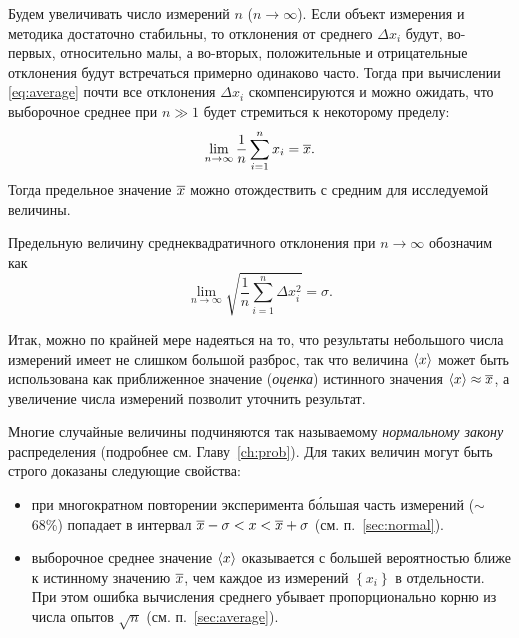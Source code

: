 Будем увеличивать число измерений $n$ ($n\to \infty$). Если объект измерения и методика
достаточно стабильны, то отклонения от среднего $\Delta x_i$ будут, во-первых,
относительно малы, а во-вторых, положительные и отрицательные отклонения будут
встречаться примерно одинаково часто. Тогда при вычислении \eqref{eq:average}
почти все отклонения $\Delta x_i$ скомпенсируются и можно ожидать,
что выборочное среднее при $n\gg 1$ будет стремиться к некоторому пределу:
\[
\lim_{n\to\infty}\frac{1}{n}\sum_{i=1}^{n}x_{i}=\overline{x}.
\]
Тогда предельное значение $\overline{x}$ можно отождествить с  средним
для исследуемой величины.

Предельную величину среднеквадратичного отклонения при $n\to\infty$
обозначим как
\[
\lim\limits _{n\to\infty}\sqrt{\frac{1}{n}\sum\limits _{i=1}^{n}\Delta
x_{i}^{2}} = \sigma.
\]




Итак, можно по крайней мере надеяться на то, что результаты небольшого числа
измерений имеет не слишком большой разброс, так что величина $\left<x\right>$
может быть использована как приближенное значение (\emph{оценка}) истинного значения
$\left<x\right>\approx \overline{x}$,
а увеличение числа измерений позволит уточнить результат.

Многие случайные величины подчиняются так называемому \emph{нормальному закону}
распределения (подробнее см. Главу~\ref{ch:prob}). Для таких величин
могут быть строго доказаны следующие свойства:
\begin{itemize}
    \item при многократном повторении эксперимента б\'{о}льшая часть измерений
    ($\sim$68\%) попадает в интервал $\overline{x}-\sigma<x<
    \overline{x}+\sigma$
    (см. п.~\ref{sec:normal}).
    \item выборочное среднее значение $\left<x\right>$ оказывается с большей
    вероятностью ближе к истинному значению $\overline{x}$, чем каждое из измерений
    $\left\{x_i\right\}$ в отдельности. При этом ошибка вычисления среднего
    убывает пропорционально корню из числа опытов $\sqrt{n}$
    (см. п.~\ref{sec:average}).
\end{itemize}

